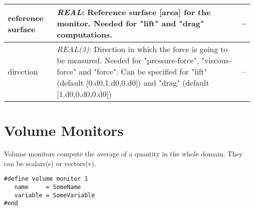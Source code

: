 \documentclass[a4paper,10pt]{report}
\begin{document}
\begin{longtable}{|p{4cm}|p{10cm}|p{2.2cm}|}
reference surface 	& 
			\textit{REAL}: Reference surface [area] for the monitor. Needed for "lift" and "drag" computations. & 
							-- \\ \hline

direction 	& 
			\textit{REAL(3)}: Direction in which the force is going to be measured. Needed for "pressure-force", "viscous-force" and "force". Can be specified for "lift" (default [0.d0,1.d0,0.d0]) and "drag" (default [1.d0,0.d0,0.d0])   & 
							-- \\ \hline
\end{longtable}


\section{Volume Monitors}
Volume monitors compute the average of a quantity in the whole domain. They can be scalars(s) or vectors(v). 

\begin{lstlisting}
#define volume monitor 1
   name     = SomeName
   variable = SomeVariable
#end
\end{lstlisting}
\end{document}

